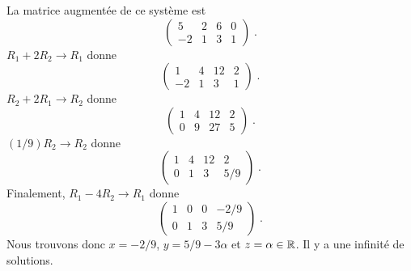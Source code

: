 {
La matrice augmentée de ce système est
\[
\left(\begin{array}{rrr|r}
5 & 2 & 6 & 0 \\ -2 & 1 & 3 & 1
\end{array}\right) \; .
\]
$R_1 + 2R_2 \to R_1$ donne
\[
\left(\begin{array}{rrr|r}
1 & 4 & 12 & 2 \\ -2 & 1 & 3 & 1
\end{array}\right) \; .
\]
$R_2 + 2 R_1 \to R_2$ donne
\[
\left(\begin{array}{rrr|r}
1 & 4 & 12 & 2 \\ 0 & 9 & 27 & 5
\end{array}\right) \; .
\]
$(1/9) R_2 \to R_2$ donne
\[
\left(\begin{array}{rrr|r}
1 & 4 & 12 & 2 \\ 0 & 1 & 3 & 5/9
\end{array}\right) \; .
\]
Finalement, $R_1 - 4R_2 \to R_1$ donne
\[
\left(\begin{array}{rrr|r}
1 & 0 & 0 & -2/9 \\ 0 & 1 & 3 & 5/9
\end{array}\right) \; .
\]
Nous trouvons donc $x= -2/9$, $y = 5/9 -3\alpha$ et $z=\alpha \in \mathbb{R}$.  Il y a
une infinité de solutions.

}
